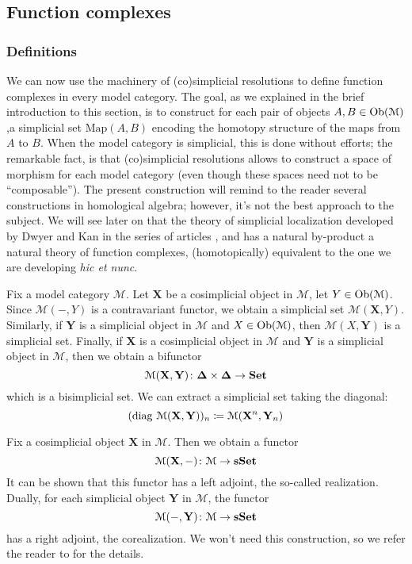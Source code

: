 \begin{refsection}
\subsection{Function complexes}

\subsubsection*{Definitions}

We can now use the machinery of (co)simplicial resolutions to define function complexes in every model category. The goal, as we explained in the brief introduction to this section, is to construct for each pair of objects $A,B \in \operatorname{Ob}(\mathcal M)$,a simplicial set $\mathrm{Map}(A,B)$ encoding the homotopy structure of the maps from $A$ to $B$. When the model category is simplicial, this is done without efforts; the remarkable fact, is that (co)simplicial resolutions allows to construct a space of morphism for each model category (even though these spaces need not to be ``composable''). The present construction will remind to the reader several constructions in homological algebra; however, it's not the best approach to the subject. We will see later on that the theory of simplicial localization developed by Dwyer and Kan in the series of articles \cite{dksimplicial}, \cite{dkcomputing} and \cite{dkfunction} has a natural by-product a natural theory of function complexes, (homotopically) equivalent to the one we are developing \emph{hic et nunc}.

Fix a model category $\mathcal M$. Let $\mathbf{X}$ be a cosimplicial object in $\mathcal M$, let $Y \in \operatorname{Ob}(\mathcal M)$. Since $\mathcal M(-,Y)$ is a contravariant functor, we obtain a simplicial set $\mathcal M(\mathbf X,Y)$. Similarly, if $\mathbf Y$ is a simplicial object in $\mathcal M$ and $X \in \operatorname{Ob}(\mathcal M)$, then $\mathcal M(X,\mathbf Y)$ is a simplicial set. Finally, if $\mathbf X$ is a cosimplicial object in $\mathcal M$ and $\mathbf Y$ is a simplicial object in $\mathcal M$, then we obtain a bifunctor
\[
\mathcal M(\mathbf X,\mathbf Y) \colon \boldsymbol\Delta \times \boldsymbol\Delta \to \mathbf{Set}
\]
which is a bisimplicial set. We can extract a simplicial set taking the diagonal:
\[
(\operatorname{\mathrm{diag} \,} \mathcal M(\mathbf X,\mathbf Y))_n\coloneqq \mathcal M(\mathbf X^n,\mathbf Y_n)
\]

\begin{rmk}
Fix a cosimplicial object $\mathbf X$ in $\mathcal M$. Then we obtain a functor
\[
\mathcal M(\mathbf X, -) \colon \mathcal M \to \mathbf{s\,\!\mathbf{Set}}
\]
It can be shown that this functor has a left adjoint, the so-called realization. Dually, for each simplicial object $\mathbf Y$ in $\mathcal M$, the functor
\[
\mathcal M(-,\mathbf Y) \colon \mathcal M \to \mathbf{s\,\!\mathbf{Set}}
\]
has a right adjoint, the corealization. We won't need this construction, so we refer the reader to \cite[Ch. 16.3]{hirschhorn} for the details.
\end{rmk}


\end{refsection}
